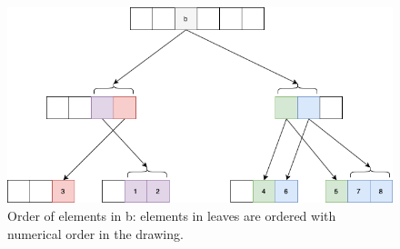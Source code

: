 \documentclass[10pt]{article}
\newcommand{\sub}[1]{\textsubscript{#1}}
\newcommand{\nf}[1]{{\normalfont{\texttt{#1}}}}
\newtheorem{lemma}[theorem]{Lemma}
\theoremstyle{definition}
\begin{document}
%
\pagebreak


\begin{figure}[hbt]
  \center\includegraphics[width=5.5in]{pics/tree}
  \caption{Order of elements in b: elements in leaves are ordered with numerical order in the drawing.}
\end{figure}
\end{document}
